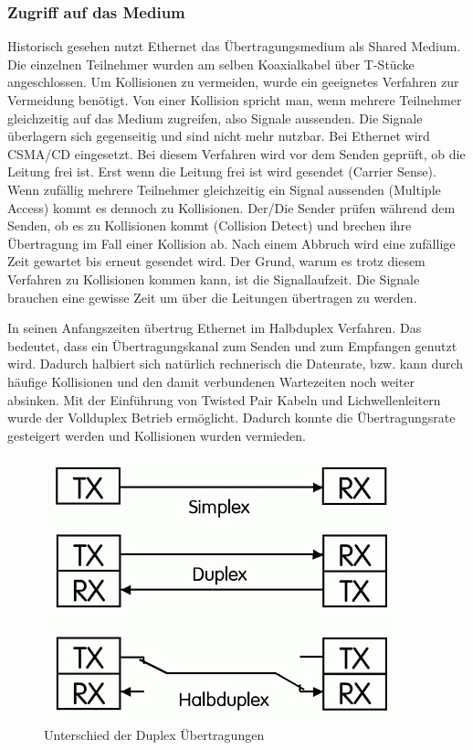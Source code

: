 \documentclass[12pt, a4paper, ngerman]{article}
\begin{document}
\subsubsection{Zugriff auf das Medium \label{zugriffEthernet}}
Historisch gesehen nutzt Ethernet das Übertragungsmedium als Shared Medium. Die einzelnen Teilnehmer wurden am selben Koaxialkabel über T-Stücke angeschlossen. Um Kollisionen zu vermeiden, wurde ein geeignetes Verfahren zur Vermeidung benötigt. Von einer Kollision spricht man, wenn mehrere Teilnehmer gleichzeitig auf das Medium zugreifen, also Signale aussenden. Die Signale  überlagern sich gegenseitig und sind nicht mehr nutzbar. Bei Ethernet wird CSMA/CD eingesetzt. Bei diesem Verfahren wird vor dem Senden geprüft, ob die Leitung frei ist. Erst wenn die Leitung frei ist wird gesendet (Carrier Sense). Wenn zufällig mehrere Teilnehmer gleichzeitig ein Signal aussenden (Multiple Access) kommt es dennoch zu Kollisionen. Der/Die Sender prüfen während dem Senden, ob es zu Kollisionen kommt (Collision Detect) und brechen ihre Übertragung im Fall einer Kollision ab. Nach einem Abbruch wird eine zufällige Zeit gewartet bis erneut gesendet wird. Der Grund, warum es trotz diesem Verfahren zu Kollisionen kommen kann, ist die Signallaufzeit. Die Signale brauchen eine gewisse Zeit um über die Leitungen übertragen zu werden. 

In seinen Anfangszeiten übertrug Ethernet im Halbduplex Verfahren. Das bedeutet, dass ein Übertragungskanal zum Senden und zum Empfangen genutzt wird. Dadurch halbiert sich natürlich rechnerisch die Datenrate, bzw. kann durch häufige Kollisionen und den damit verbundenen Wartezeiten noch weiter absinken. Mit der Einführung von Twisted Pair Kabeln und Lichwellenleitern wurde der Vollduplex Betrieb ermöglicht. Dadurch konnte die Übertragungsrate gesteigert werden und Kollisionen wurden vermieden.
\begin{figure}[H]
	\centering
	\includegraphics[width=0.4\linewidth]{Grafiken/duplex.jpg}
	\caption{Unterschied der Duplex Übertragungen \cite{duplex}}
	\label{duplex}
\end{figure}
 
\end{document}
